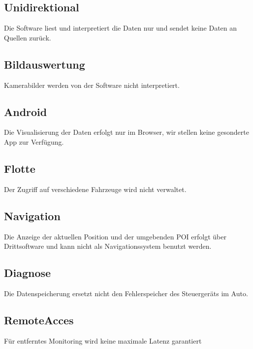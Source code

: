 \documentclass[pflichtenheft.tex]{subfiles}
\begin{document}
\subsection{\mknr Unidirektional} Die Software liest und interpretiert die Daten nur und sendet keine Daten an Quellen zurück.

\subsection{\mknr Bildauswertung} Kamerabilder werden von der Software nicht interpretiert.

\subsection{\mknr Android} Die Visualisierung der Daten erfolgt nur im Browser, wir stellen keine gesonderte App zur Verfügung.

\subsection{\mknr Flotte} Der Zugriff auf verschiedene Fahrzeuge wird nicht verwaltet.

\subsection{\mknr Navigation} Die Anzeige der aktuellen Position und der umgebenden POI erfolgt über Drittsoftware und kann nicht als Navigationssystem benutzt werden.

\subsection{\mknr Diagnose} Die Datenspeicherung ersetzt nicht den Fehlerspeicher des Steuergeräts im Auto.

\subsection{\mknr RemoteAcces} Für entferntes Monitoring wird keine maximale Latenz garantiert 
\end{document}

